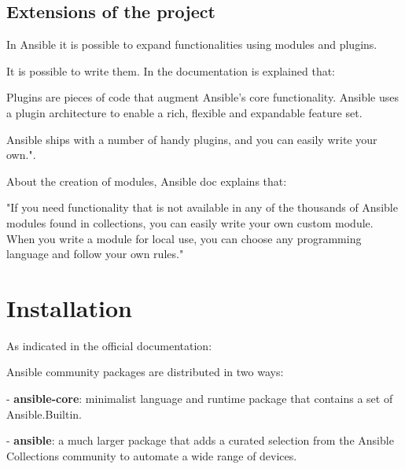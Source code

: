 \documentclass[12pt,a4paper,openright,twoside]{book}
\begin{document}

\subsection{Extensions of the project}
In Ansible it is possible to expand functionalities using modules and plugins.


It is possible to write them. In the documentation is explained that:


Plugins are pieces of code that augment Ansible's core functionality. Ansible uses a plugin architecture to enable a rich, flexible and expandable feature set.


Ansible ships with a number of handy plugins, and you can easily write your own."\cite{ansibleDocPlugins}.


About the creation of modules, Ansible doc explains that:


"If you need functionality that is not available in any of the thousands of Ansible modules found in collections, you can easily write your own custom module. When you write a module for local use, you can choose any programming language and follow your own rules."\cite{ansibleDocNewModules}

\section{Installation}
As indicated in the official documentation\cite{ansibleDocInstall}:

Ansible community packages are distributed in two ways:

- \textbf{ansible-core}: minimalist language and runtime package that contains a set of Ansible.Builtin.

- \textbf{ansible}: a much larger package that adds a curated selection from the Ansible Collections community to automate a wide range of devices.
\end{document}
